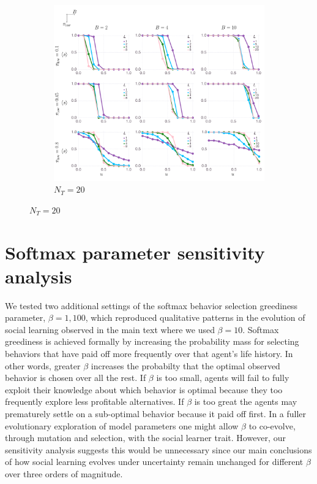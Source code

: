 \documentclass[letterpaper,11.5pt]{scrartcl}
\begin{document}
\newpage
\begin{figure}
  \ContinuedFloat
  \begin{subfigure}{\textwidth}
	\caption{$N_T = 20$}
	\includegraphics[width=\textwidth]{Figures/supplement/nteachers=20/mainResultsPlots.pdf}
  \end{subfigure}
\end{figure}

\clearpage


\section{Softmax parameter sensitivity analysis} 

We tested two additional settings of the softmax behavior selection greediness parameter,
$\beta=1,100$, which reproduced qualitative patterns in the evolution of social learning
observed in the main text where we used $\beta=10$.  
Softmax greediness is achieved formally by increasing the
probability mass for selecting behaviors that have paid off more frequently over that agent's
life history. In other words, greater $\beta$ increases the probabilty that the optimal
observed behavior is chosen over all the rest. If $\beta$ is too small, agents will fail to
fully exploit their knowledge about which behavior is optimal because they too frequently
explore less profitable alternatives.  If $\beta$ is too great the agents may prematurely
settle on a sub-optimal behavior because it paid off first.  In a fuller evolutionary
exploration of model parameters one might allow $\beta$ to co-evolve, through
mutation and selection, with the social learner trait.  
However, our sensitivity analysis suggests this would be unnecessary 
since our main conclusions of how social learning evolves under uncertainty remain unchanged for different
$\beta$ over three orders of magnitude.
\end{document}
